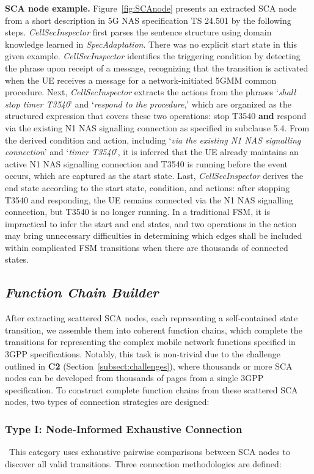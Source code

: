 \documentclass[sigconf]{acmart}
\newcommand{\lm}{\textit{CellSecInspector}\xspace}
\begin{document}
{\noindent\textbf{SCA node example.} 
Figure~\ref{fig:SCAnode} presents an extracted SCA node from a short description in 5G NAS specification TS 24.501 by the following steps.       
\lm first parses the sentence structure using domain knowledge learned in \textit{SpecAdaptation}. There was no explicit start state in this given example. \lm identifies the triggering condition by detecting the phrase upon receipt of a message, recognizing that the transition is activated when the UE receives a message for a network-initiated 5GMM common procedure. Next, \lm extracts the actions from the phrases `\textit{shall stop timer T3540}' and `\textit{respond to the procedure},' which are organized as the structured expression that covers these two operations: stop T3540 \textbf{and} respond via the existing N1 NAS signalling connection as specified in subclause 5.4. From the derived condition and action, including `\textit{via the existing N1 NAS signalling connection}' and `\textit{timer T3540}', it is inferred that the UE already maintains an active N1 NAS signalling connection and T3540 is running before the event occurs, which are captured as the start state. Last, \lm derives the end state according to the start state, condition, and actions: after stopping T3540 and responding, the UE remains connected via the N1 NAS signalling connection, but T3540 is no longer running. In a traditional FSM, it is impractical to infer the start and end states, and two operations in the action may bring unnecessary difficulties in determining which edges shall be included within complicated FSM transitions when there are thousands of connected states.  



\subsection{\textit{Function Chain Builder}}
After extracting scattered SCA nodes, each representing a self-contained state transition, we assemble them into coherent function chains, which complete the transitions for representing the complex mobile network functions specified in 3GPP specifications. Notably, this task is non-trivial due to the challenge outlined in \textbf{C2} (Section~\ref{subsect:challenges}), where thousands or more SCA nodes can be developed from thousands of pages from a single 3GPP specification. To construct complete function chains from these scattered SCA nodes, two types of connection strategies are designed: 


\subsubsection{Type I: Node-Informed Exhaustive Connection}
~This category uses exhaustive pairwise comparisons between SCA nodes to discover all valid transitions. Three connection methodologies are defined:


}
\end{document}
